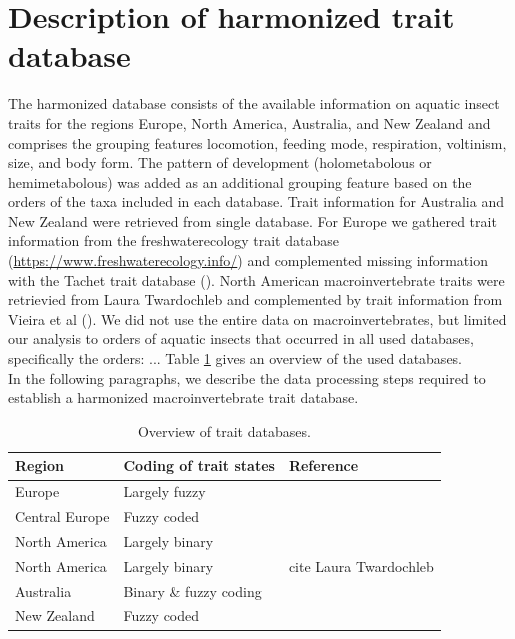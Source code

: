 \documentclass{article}
\begin{document}
\section{Description of harmonized trait database} %

The harmonized database consists of the available information on aquatic 
insect traits for the regions Europe, North America, Australia, and New Zealand
and comprises the grouping features locomotion, feeding mode, respiration, 
voltinism, size, and body form. The pattern of development (holometabolous or hemimetabolous) 
was added as an additional grouping feature based on the orders of the taxa 
included in each database. 
Trait information for Australia and New Zealand were retrieved from 
single database. For Europe we gathered trait information from the 
freshwaterecology trait database (\url{https://www.freshwaterecology.info/}) 
and complemented missing information with the 
Tachet trait database (\cite{usseglio-polatera_biomonitoring_2000}). 
North American macroinvertebrate traits were retrievied from Laura Twardochleb and 
complemented by trait information from Vieira et al (\cite{vieira_database_nodate}). 
We did not use the entire data on macroinvertebrates, 
but limited our analysis to orders of aquatic insects that occurred in all used
databases, specifically the orders:
...
Table \ref{tab:trait_databases} gives an overview of the used databases. \\ 
In the following paragraphs, we describe the data processing steps required to 
establish a harmonized macroinvertebrate trait database. 

\begin{table}[H]
    \centering
    \caption{Overview of trait databases.}
    \label{tab:trait_databases}
    \begin{tabular}{lll}
    \toprule
   Region & Coding of trait states & Reference \\ 
    \hline
   Europe & Largely fuzzy & \cite{schmidt-kloiber_www.freshwaterecology.info_2015}\\ 
   Central Europe & Fuzzy coded & \cite{usseglio-polatera_biomonitoring_2000} \\ 
   North America & Largely binary & \cite{vieira_database_nodate}\\
   North America & Largely binary & cite Laura Twardochleb \\
   Australia & Binary \& fuzzy coding  & \cite{kefford_ben_AST_DB_2019}\\ 
   New Zealand & Fuzzy coded & \\ %
    \bottomrule
    \end{tabular}
\end{table}
\end{document}
